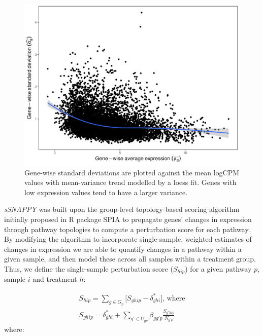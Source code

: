 \documentclass[9pt,a4paper,]{extarticle}
\begin{document}
\begin{figure}

{\centering \includegraphics[width=1\linewidth]{sSNAPPY_paper_files/figure-latex/Figure2} 

}

\caption{Gene-wise standard deviations are plotted against the mean logCPM values with mean-variance trend modelled by a loess fit. Genes with low expression values tend to have a larger variance.}\label{fig:Figure2}
\end{figure}

\emph{sSNAPPY} was built upon the group-level topology-based scoring algorithm initially proposed in R package SPIA\citep{Tarca2009} to propagate genes' changes in expression through pathway topologies to compute a perturbation score for each pathway.
By modifying the algorithm to incorporate single-sample, weighted estimates of changes in expression we are able to quantify changes in a pathway within a given sample, and then model these across all samples within a treatment group.
Thus, we define the single-sample perturbation score (\(S_{hip}\)) for a given pathway \(p\), sample \(i\) and treatment \(h\):

\[
\begin{aligned}
S_{hip} = \sum_{g \in G_p} \lbrack S_{ghip} - \delta_{ghi}^*\rbrack \text{, where} \\
S_{ghip} = \delta_{ghi}^* + \sum_{g' \in U_{gp}} \beta_{gg'p} \frac{S_{g'hip}}{N_{g'p}} 
\end{aligned}
\]
where:
\end{document}

